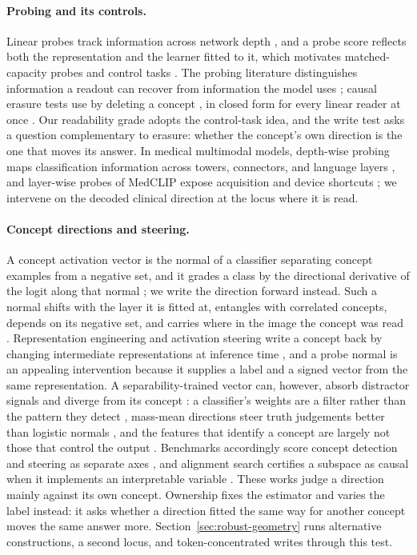 \documentclass{article}
\begin{document}
\paragraph{Probing and its controls.}
Linear probes track information across network depth \citep{alain2017understanding}, and a probe score reflects both the representation and the learner fitted to it, which motivates matched-capacity probes and control tasks \citep{hewitt2019designing}. The probing literature distinguishes information a readout can recover from information the model uses \citep{belinkov2022probing,ravichander2021probing}; causal erasure tests use by deleting a concept \citep{ravfogel2020null,elazar2021amnesic}, in closed form for every linear reader at once \citep{belrose2023leace}. Our readability grade adopts the control-task idea, and the write test asks a question complementary to erasure: whether the concept's own direction is the one that moves its answer. In medical multimodal models, depth-wise probing maps classification information across towers, connectors, and language layers \citep{zhu2026lost}, and layer-wise probes of MedCLIP expose acquisition and device shortcuts \citep{pedersen2026probes}; we intervene on the decoded clinical direction at the locus where it is read.

\paragraph{Concept directions and steering.}
A concept activation vector is the normal of a classifier separating concept examples from a negative set, and it grades a class by the directional derivative of the logit along that normal \citep{kim2018tcav}; we write the direction forward instead. Such a normal shifts with the layer it is fitted at, entangles with correlated concepts, depends on its negative set, and carries where in the image the concept was read \citep{nicolson2025explaining}. Representation engineering and activation steering write a concept back by changing intermediate representations at inference time \citep{zou2023representation,turner2023steering,panickssery2024caa}, and a probe normal is an appealing intervention because it supplies a label and a signed vector from the same representation. A separability-trained vector can, however, absorb distractor signals and diverge from its concept \citep{pahde2025navigating}: a classifier's weights are a filter rather than the pattern they detect \citep{haufe2014interpretation}, mass-mean directions steer truth judgements better than logistic normals \citep{marks2024geometry}, and the features that identify a concept are largely not those that control the output \citep{arad2025saes}. Benchmarks accordingly score concept detection and steering as separate axes \citep{wu2025axbench}, and alignment search certifies a subspace as causal when it implements an interpretable variable \citep{geiger2024alignments}. These works judge a direction mainly against its own concept. Ownership fixes the estimator and varies the label instead: it asks whether a direction fitted the same way for another concept moves the same answer more. Section~\ref{sec:robust-geometry} runs alternative constructions, a second locus, and token-concentrated writes through this test.
\end{document}
